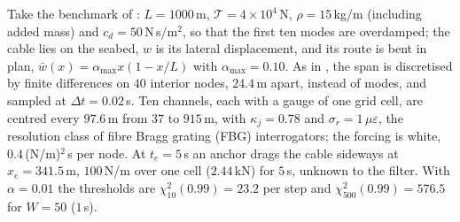 \documentclass[graybox,envcountchap]{style/SNmono}
\begin{document}
\begin{example}
\label{ex:ch07-cable-das}
Take the benchmark of \cite{oliva_quadratic_ejc_2026}: $L=1000$\,m, $\mathcal{T}=4\times10^{4}$\,N, $\rho=15$\,kg/m (including added mass) and $c_d=50$\,N\,s/m$^{2}$, so that the first ten modes are overdamped; the cable lies on the seabed, $w$ is its lateral displacement, and its route is bent in plan, $\bar w(x)=\alpha_{\max}x(1-x/L)$ with $\alpha_{\max}=0.10$. As in \cite{oliva_quadratic_ejc_2026}, the span is discretised by finite differences on $40$ interior nodes, $24.4$\,m apart, instead of modes, and sampled at $\Delta t=0.02$\,s. Ten channels, each with a gauge of one grid cell, are centred every $97.6$\,m from $37$ to $915$\,m, with $\kappa_j=0.78$ and $\sigma_r=1$\,$\mu\varepsilon$, the resolution class of fibre Bragg grating (FBG) interrogators; the forcing is white, $0.4$\,(N/m)$^{2}$\,s per node. At $t_e=5$\,s an anchor drags the cable sideways at $x_e=341.5$\,m, $100$\,N/m over one cell ($2.44$\,kN) for $5$\,s, unknown to the filter. With $\alpha=0.01$ the thresholds are $\chi^{2}_{10}(0.99)=23.2$ per step and $\chi^{2}_{500}(0.99)=576.5$ for $W=50$ ($1$\,s).


\end{example}
\end{document}
